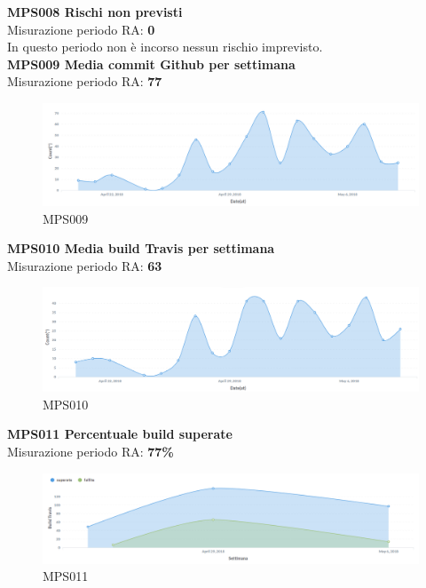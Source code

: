 \documentclass[PianoDiQualifica.tex]{subfiles}
\begin{document}
\textbf{MPS008 Rischi non previsti}\\
Misurazione periodo RA: \textbf{0}\\
In questo periodo non è incorso nessun rischio imprevisto.\\

\textbf{MPS009 Media commit Github per settimana}\\
Misurazione periodo RA: \textbf{77}
\begin{figure}[H]
	\centering
	\includegraphics[width=1\linewidth]{RA/MPS009}
	\caption{MPS009}
	\label{fig:processi}
\end{figure}

\newpage

\textbf{MPS010 Media build Travis per settimana}\\
Misurazione periodo RA: \textbf{63}
\begin{figure}[H]
	\centering
	\includegraphics[width=1\linewidth]{RA/MPS010}
	\caption{MPS010}
	\label{fig:processi}
\end{figure}


\textbf{MPS011 Percentuale build superate}\\
Misurazione periodo RA: \textbf{77\%}
\begin{figure}[H]
	\centering
	\includegraphics[width=1\linewidth]{RA/MPS011}
	\caption{MPS011}
	\label{fig:processi}
\end{figure}
\end{document}

